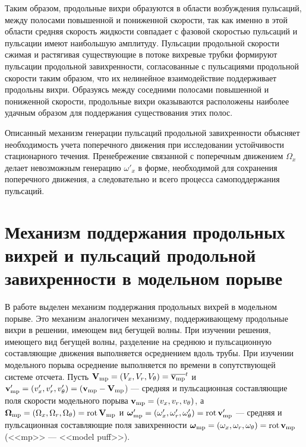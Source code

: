 Таким образом, продольные вихри образуются в области возбуждения пульсаций, между полосами повышенной и пониженной скорости, так как именно в этой области средняя скорость жидкости совпадает с фазовой скоростью пульсаций и пульсации имеют наибольшую амплитуду. Пульсации продольной скорости сжимая и растягивая существующие в потоке вихревые трубки формируют пульсации продольной завихренности, согласованные с пульсациями продольной скорости таким образом, что их нелинейное взаимодействие поддерживает продольны вихри. Образуясь между соседними полосами повышенной и пониженной скорости, продольные вихри оказываются расположены наиболее удачным образом для поддержания существования этих полос. 

Описанный механизм генерации пульсаций продольной завихренности объясняет необходимость учета поперечного движения при исследовании устойчивости стационарного течения. Пренебрежение связанной с поперечным движением $\Omega_x$ делает невозможным генерацию $\omega'_x$ в форме, необходимой для сохранения поперечного движения, а следовательно и всего процесса самоподдержания пульсаций.


\section{Механизм поддержания продольных вихрей и пульсаций продольной завихренности в модельном порыве} \label{edge_oxgen}

В работе выделен механизм поддержания продольных вихрей в модельном порыве. Это механизм аналогичен механизму, поддерживающему продольные вихри в решении, имеющем вид бегущей волны. При изучении решения, имеющего вид бегущей волны, разделение на среднюю и пульсационную составляющие движения выполняется осреднением вдоль трубы. При изучении модельного порыва осреднение выполняется по времени в сопутствующей системе отсчета. Пусть $\mathbf{V}_\mathrm{mp} = (V_x, V_r, V_\theta) = \overline{\mathbf{v}_\mathrm{mp}}^t$ и $\mathbf{v}'_\mathrm{mp} = (v'_x, v'_r, v'_\theta) = (\mathbf{v}_\mathrm{mp} - \mathbf{V}_\mathrm{mp}$) --- средняя и пульсационная составляющие поля скорости модельного порыва $\mathbf{v}_\mathrm{mp} = (v_x, v_r, v_\theta)$, а $\mbox{\boldmath$\Omega$}_\mathrm{mp} = (\Omega_x, \Omega_r, \Omega_\theta) = \mathop{}\!\operatorname{rot} \mathbf{V}_\mathrm{mp}$ и $\mbox{\boldmath$\omega$}'_\mathrm{mp} = (\omega'_x, \omega'_r, \omega'_\theta) = \mathop{}\!\operatorname{rot} \mathbf{v}'_\mathrm{mp}$ --- средняя и пульсационная составляющие поля завихренности $\mbox{\boldmath$\omega$}_\mathrm{mp} = (\omega_x, \omega_r, \omega_\theta) = \mathop{}\!\operatorname{rot} \mathbf{v}_\mathrm{mp}$ (<<mp>> --- <<model puff>>). 

